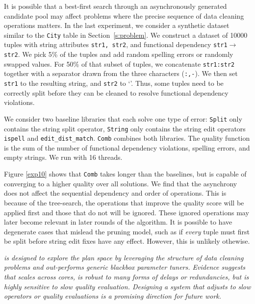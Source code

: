 It is possible that a best-first search through an asynchronously generated candidate pool may affect problems where the precise sequence of data cleaning operations matters.
In the last experiment, we consider a synthetic dataset similar to the \texttt{City} table in Section~\ref{s:problem}.  
We construct a dataset of 10000 tuples with string attributes \texttt{str1, str2}, and functional dependency \texttt{str1$\rightarrow$str2}.  We pick 5\% of the tuples and add random spelling errors or randomly swapped values. For 50\% of that subset of tuples, we concatenate \texttt{str1:str2} together with a separator drawn from the three characters (\texttt{:,-}).  We then set \texttt{str1} to the resulting string, and \texttt{str2} to `'.  Thus, some tuples need to be correctly split before they can be cleaned to resolve functional dependency violations.

We consider two baseline libraries that each solve one type of error: \texttt{Split} only contains the string split operator, \texttt{String} only contains the string edit operators \texttt{ispell} and \texttt{edit\_dist\_match}.  \texttt{Comb} combines both libraries.  The quality function is the sum of the number of functional dependency violations, spelling errors, and empty strings.  We run \sys with 16 threads.

Figure \ref{exp10} shows that \texttt{Comb} takes longer than the baselines, but is capable of converging to a higher quality over all solutions.
We find that the asynchrony does not affect the sequential dependency and order of operations.
This is because of the tree-search, the operations that improve the quality score will be applied first and those that do not will be ignored.
These ignored operations may later become relevant in later rounds of the algorithm.  It is possible to have degenerate cases that mislead the pruning model, such as if {\it every} tuple must first be split before string edit fixes have any effect.  However, this is unlikely othewise.

{\it {} \sys is designed to explore the plan space by leveraging the structure of data cleaning problems and out-performs generic blackbox parameter tuners.  Evidence suggests that \sys scales across cores, is robust to many forms of delays or redundancies, but is highly sensitive to slow quality evaluation.  Designing a system that adjusts to slow operators or quality evaluations is a promising direction for future work.}

